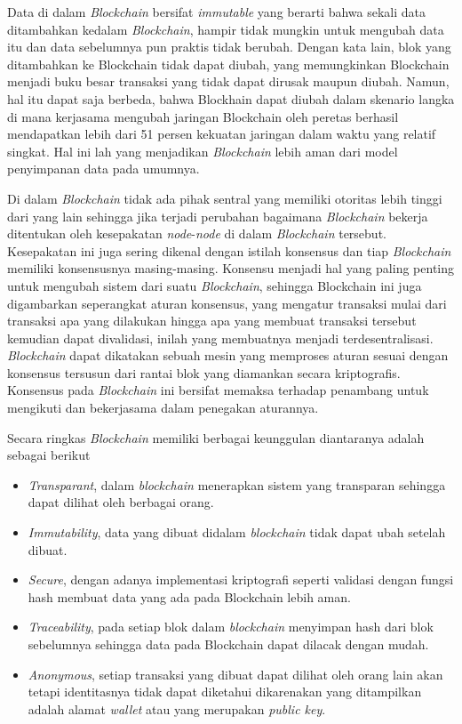 Data di dalam \emph{Blockchain} bersifat \emph{immutable} yang berarti bahwa sekali data ditambahkan kedalam \emph{Blockchain}, hampir tidak mungkin
untuk mengubah data itu dan data sebelumnya pun praktis tidak berubah. Dengan kata
lain, blok yang ditambahkan ke Blockchain tidak dapat diubah, yang memungkinkan Blockchain menjadi buku besar transaksi yang tidak dapat dirusak maupun diubah. Namun,
hal itu dapat saja berbeda, bahwa Blockhain dapat diubah dalam skenario langka di mana
kerjasama mengubah jaringan Blockchain oleh peretas berhasil mendapatkan lebih dari
51 persen kekuatan jaringan dalam waktu yang relatif singkat. Hal ini lah yang menjadikan \emph{Blockchain} lebih aman dari model penyimpanan data pada umumnya. 

Di dalam \emph{Blockchain} tidak ada pihak sentral yang memiliki otoritas lebih tinggi dari yang lain sehingga jika terjadi perubahan bagaimana \emph{Blockchain} bekerja ditentukan oleh kesepakatan \emph{node}-\emph{node} di dalam \emph{Blockchain} tersebut. Kesepakatan ini juga sering dikenal dengan istilah konsensus dan tiap \emph{Blockchain} memiliki konsensusnya masing-masing.
Konsensu menjadi hal yang paling penting untuk mengubah sistem dari suatu \emph{Blockchain}, sehingga
Blockchain ini juga digambarkan seperangkat aturan konsensus, yang mengatur transaksi
mulai dari transaksi apa yang dilakukan hingga apa yang membuat transaksi tersebut
kemudian dapat divalidasi, inilah yang membuatnya menjadi terdesentralisasi. \emph{Blockchain}
dapat dikatakan sebuah mesin yang memproses aturan sesuai dengan konsensus tersusun
dari rantai blok yang diamankan secara kriptografis. Konsensus pada \emph{Blockchain} ini bersifat memaksa terhadap penambang untuk mengikuti dan bekerjasama dalam penegakan
aturannya. \parencite{antonopoulos2018mastering}

Secara ringkas \emph{Blockchain} memiliki berbagai keunggulan diantaranya adalah sebagai berikut
\begin{itemize}
    \item \emph{Transparant}, dalam \emph{blockchain} menerapkan sistem yang transparan sehingga dapat dilihat oleh berbagai orang.
    \item \emph{Immutability}, data yang dibuat didalam \emph{blockchain} tidak dapat ubah setelah dibuat.
    \item \emph{Secure}, dengan adanya implementasi kriptografi seperti validasi dengan fungsi hash membuat data yang ada pada Blockchain lebih aman.
    \item \emph{Traceability}, pada setiap blok dalam \emph{blockchain} menyimpan hash dari blok sebelumnya sehingga data pada Blockchain dapat dilacak dengan mudah.
    \item \emph{Anonymous}, setiap transaksi yang dibuat dapat dilihat oleh orang lain akan tetapi identitasnya tidak dapat diketahui dikarenakan yang ditampilkan adalah alamat \emph{wallet} atau yang merupakan \emph{public key}.
  \end{itemize}

